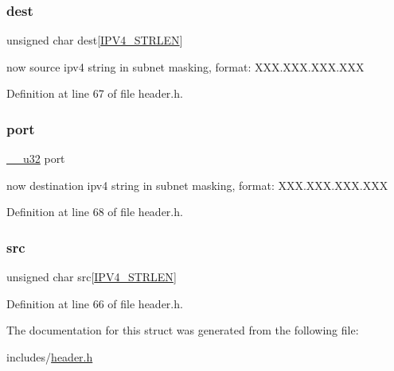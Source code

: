 \subsubsection{\texorpdfstring{dest}{dest}}
{\footnotesize\ttfamily unsigned char dest\mbox{[}\hyperlink{header_8h_ad5057f0ae40bc5ff36e7c9e65ea6c457}{I\+P\+V4\+\_\+\+S\+T\+R\+L\+EN}\mbox{]}}

now source ipv4 string in subnet masking, format\+: X\+X\+X.\+X\+X\+X.\+X\+X\+X.\+X\+XX 

Definition at line 67 of file header.\+h.

\mbox{\label{struct_masking_arguments_a14bfc613b878123fb95556e7a098089d}} 
\subsubsection{\texorpdfstring{port}{port}}
{\footnotesize\ttfamily \hyperlink{asm__types_8h_a3acae9310e2c2e411e800a8a369171c6}{\+\_\+\+\_\+u32} port}

now destination ipv4 string in subnet masking, format\+: X\+X\+X.\+X\+X\+X.\+X\+X\+X.\+X\+XX 

Definition at line 68 of file header.\+h.

\mbox{\label{struct_masking_arguments_a70b9300e7d151f7aadcba8a1c81f3fd9}} 
\subsubsection{\texorpdfstring{src}{src}}
{\footnotesize\ttfamily unsigned char src\mbox{[}\hyperlink{header_8h_ad5057f0ae40bc5ff36e7c9e65ea6c457}{I\+P\+V4\+\_\+\+S\+T\+R\+L\+EN}\mbox{]}}



Definition at line 66 of file header.\+h.



The documentation for this struct was generated from the following file\+:\begin{DoxyCompactItemize}
\item 
includes/\hyperlink{header_8h}{header.\+h}\end{DoxyCompactItemize}

